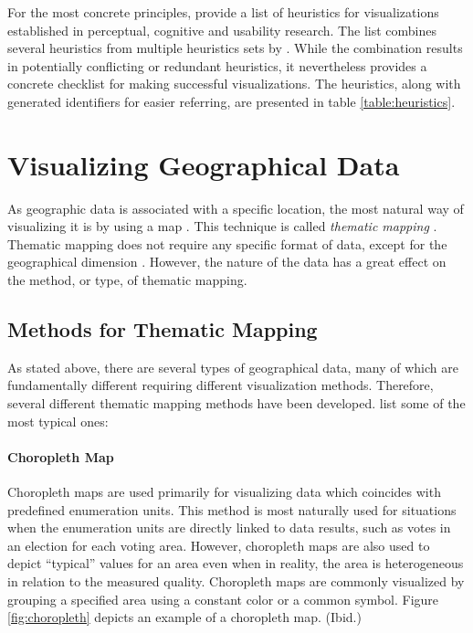 For the most concrete principles, \citet{zuk_heuristics_2006} provide a list of heuristics for visualizations established in perceptual, cognitive and usability research. The list combines several heuristics from multiple heuristics sets by \citet{shneiderman_eyes_1996,zuk_theoretical_2006,amar_knowledge_2004}. While the combination results in potentially conflicting or redundant heuristics, it nevertheless provides a concrete checklist for making successful visualizations. The heuristics, along with generated identifiers for easier referring, are presented in table \ref{table:heuristics}.

\section{Visualizing Geographical Data}

As geographic data is associated with a specific location, the most natural way of visualizing it is by using a map \citep[chap.~1]{kraak_cartographic_1998,kraak_cartography_2011}. This technique is called \emph{thematic mapping} \citep[chap.~1]{slocum_thematic_2014}. Thematic mapping does not require any specific format of data, except for the geographical dimension \citep[chap.~1]{kraak_cartography_2011}. However, the nature of the data has a great effect on the method, or type, of thematic mapping.

\subsection{Methods for Thematic Mapping}
\label{subsection:mappingmethods}

As stated above, there are several types of geographical data, many of which are fundamentally different requiring different visualization methods. Therefore, several different thematic mapping methods have been developed. \citet[chap.~14-18]{slocum_thematic_2014} list some of the most typical ones:

\paragraph{Choropleth Map}

Choropleth maps are used primarily for visualizing data which coincides with predefined enumeration units. This method is most naturally used for situations when the enumeration units are directly linked to data results, such as votes in an election for each voting area. However, choropleth maps are also used to depict ``typical'' values for an area even when in reality, the area is heterogeneous in relation to the measured quality. Choropleth maps are commonly visualized by grouping a specified area using a constant color or a common symbol. Figure \ref{fig:choropleth} depicts an example of a choropleth map. (Ibid.)

